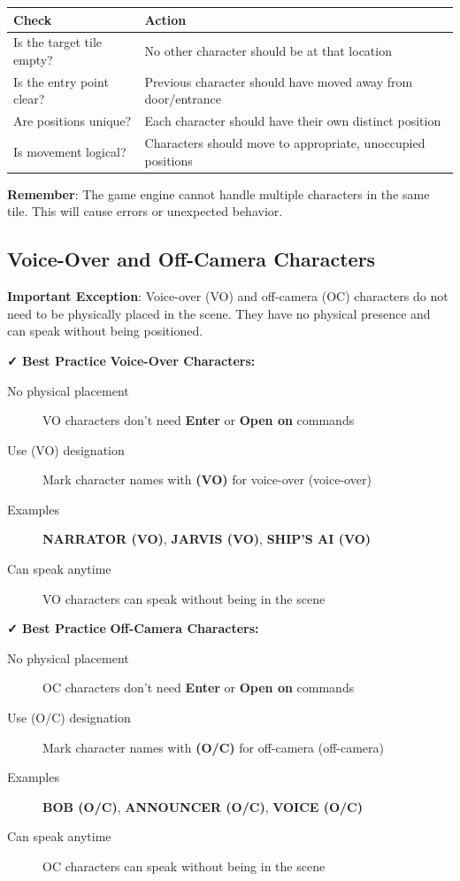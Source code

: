 \documentclass[11pt,letterpaper,oldstylefigures]{memoir}
\newcommand{\fountain}[1]{\textbf{#1}}
\begin{document}
\begin{center}
\begin{tabular}{|l|l|}
\hline
\textbf{Check} & \textbf{Action} \\
\hline
Is the target tile empty? & No other character should be at that location \\
Is the entry point clear? & Previous character should have moved away from door/entrance \\
Are positions unique? & Each character should have their own distinct position \\
Is movement logical? & Characters should move to appropriate, unoccupied positions \\
\hline
\end{tabular}
\end{center}

\textbf{Remember}: The game engine cannot handle multiple characters in the same tile. This will cause errors or unexpected behavior.

\subsection{Voice-Over and Off-Camera Characters}

\textbf{Important Exception}: Voice-over (VO) and off-camera (OC) characters do not need to be physically placed in the scene. They have no physical presence and can speak without being positioned.

\textbf{✓ Best Practice}
\textbf{Voice-Over Characters:}
\begin{description}
\item[No physical placement] VO characters don't need \fountain{Enter} or \fountain{Open on} commands
\item[Use (VO) designation] Mark character names with \fountain{(VO)} for voice-over (\gls{voice-over})
\item[Examples] \fountain{NARRATOR (VO)}, \fountain{JARVIS (VO)}, \fountain{SHIP'S AI (VO)}
\item[Can speak anytime] VO characters can speak without being in the scene
\end{description}


\textbf{✓ Best Practice}
\textbf{Off-Camera Characters:}
\begin{description}
\item[No physical placement] OC characters don't need \fountain{Enter} or \fountain{Open on} commands
\item[Use (O/C) designation] Mark character names with \fountain{(O/C)} for off-camera (\gls{off-camera})
\item[Examples] \fountain{BOB (O/C)}, \fountain{ANNOUNCER (O/C)}, \fountain{VOICE (O/C)}
\item[Can speak anytime] OC characters can speak without being in the scene
\end{description}
\end{document}
